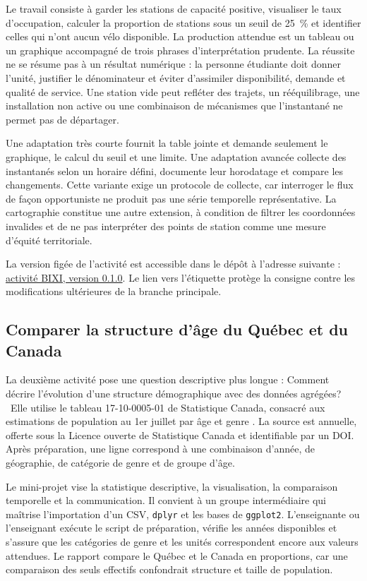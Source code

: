 Le travail consiste à garder les stations de capacité positive, visualiser le taux d'occupation, calculer la proportion de stations sous un seuil de 25~\% et identifier celles qui n'ont aucun vélo disponible. La production attendue est un tableau ou un graphique accompagné de trois phrases d'interprétation prudente. La réussite ne se résume pas à un résultat numérique : la personne étudiante doit donner l'unité, justifier le dénominateur et éviter d'assimiler disponibilité, demande et qualité de service. Une station vide peut refléter des trajets, un rééquilibrage, une installation non active ou une combinaison de mécanismes que l'instantané ne permet pas de départager.

Une adaptation très courte fournit la table jointe et demande seulement le graphique, le calcul du seuil et une limite. Une adaptation avancée collecte des instantanés selon un horaire défini, documente leur horodatage et compare les changements. Cette variante exige un protocole de collecte, car interroger le flux de façon opportuniste ne produit pas une série temporelle représentative. La cartographie constitue une autre extension, à condition de filtrer les coordonnées invalides et de ne pas interpréter des points de station comme une mesure d'équité territoriale.

La version figée de l'activité est accessible dans le dépôt à l'adresse suivante : \href{https://github.com/AurelienNicosiaULaval/donnees-bleues/blob/v0.1.0/datasets/bixi/activite-courte.qmd}{activité BIXI, version 0.1.0}. Le lien vers l'étiquette protège la consigne contre les modifications ultérieures de la branche principale.

\subsection{Comparer la structure d'âge du Québec et du Canada}

La deuxième activité pose une question descriptive plus longue : \og Comment décrire l'évolution d'une structure démographique avec des données agrégées? \fg~Elle utilise le tableau 17-10-0005-01 de Statistique Canada, consacré aux estimations de population au 1er juillet par âge et genre \cite{statcan}. La source est annuelle, offerte sous la Licence ouverte de Statistique Canada et identifiable par un DOI. Après préparation, une ligne correspond à une combinaison d'année, de géographie, de catégorie de genre et de groupe d'âge.

Le mini-projet vise la statistique descriptive, la visualisation, la comparaison temporelle et la communication. Il convient à un groupe intermédiaire qui maîtrise l'importation d'un CSV, \texttt{dplyr} et les bases de \texttt{ggplot2}. L'enseignante ou l'enseignant exécute le script de préparation, vérifie les années disponibles et s'assure que les catégories de genre et les unités correspondent encore aux valeurs attendues. Le rapport compare le Québec et le Canada en proportions, car une comparaison des seuls effectifs confondrait structure et taille de population.


